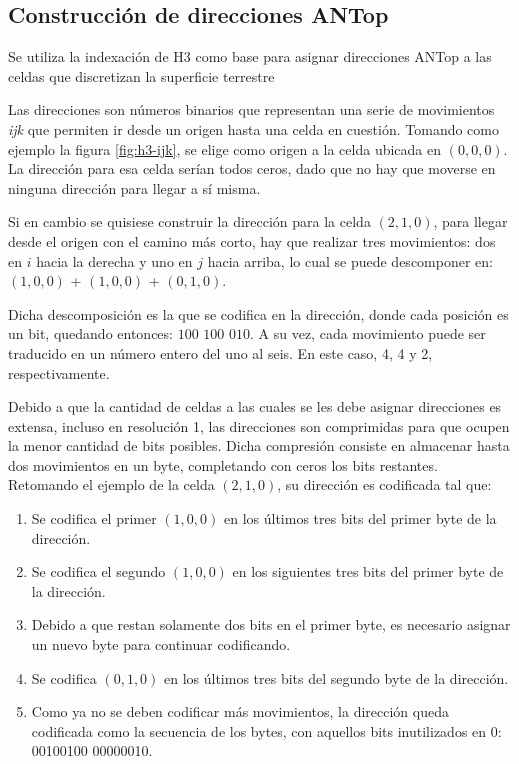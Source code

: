 \subsection{Construcción de direcciones ANTop}

Se utiliza la indexación de H3 como base para asignar direcciones ANTop a las celdas que discretizan la superficie terrestre

Las direcciones son números binarios que representan una serie de movimientos \textit{ijk} que permiten ir desde un origen hasta una celda en cuestión. Tomando como ejemplo la figura \ref{fig:h3-ijk}, se elige como origen a la celda ubicada en $(0,0,0)$. La dirección para esa celda serían todos ceros, dado que no hay que moverse en ninguna dirección para llegar a sí misma.

Si en cambio se quisiese construir la dirección para la celda $(2,1,0)$, para llegar desde el origen con el camino más corto, hay que realizar tres movimientos: dos en $i$ hacia la derecha y uno en $j$ hacia arriba, lo cual se puede descomponer en: $(1,0,0)$ + $(1,0,0)$ + $(0,1,0)$.

Dicha descomposición es la que se codifica en la dirección, donde cada posición es un bit, quedando entonces: $100$ $100$ $010$.
A su vez, cada movimiento puede ser traducido en un número entero del uno al seis. En este caso, 4, 4 y 2, respectivamente.

Debido a que la cantidad de celdas a las cuales se les debe asignar direcciones es extensa, incluso en resolución 1, las direcciones son comprimidas para que ocupen la menor cantidad de bits posibles. Dicha compresión consiste en almacenar hasta dos movimientos en un byte, completando con ceros los bits restantes. Retomando el ejemplo de la celda $(2,1,0)$, su dirección es codificada tal que:
\begin{enumerate}
\item Se codifica el primer $(1,0,0)$ en los últimos tres bits del primer byte de la dirección.
\item Se codifica el segundo $(1,0,0)$ en los siguientes tres bits del primer byte de la dirección.
\item Debido a que restan solamente dos bits en el primer byte, es necesario asignar un nuevo byte para continuar codificando.
\item Se codifica $(0,1,0)$ en los últimos tres bits del segundo byte de la dirección.
\item Como ya no se deben codificar más movimientos, la dirección queda codificada como la secuencia de los bytes, con aquellos bits inutilizados en 0: 00100100 00000010.
\end{enumerate}

